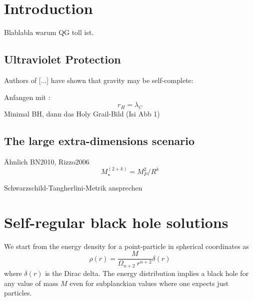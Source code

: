 \documentclass[10pt,a4paper, fleqn]{article}
\begin{document}
\section{Introduction}
Blablabla warum QG toll ist.

\subsection{Ultraviolet Protection}
Authors of [...] have shown that gravity may be self-complete:

Anfangen mit \cite{Isi1}:
\begin{equation}
r_H = \lambda_C
\end{equation}
Minimal BH, dann das Holy Grail-Bild (Isi Abb 1)

\subsection{The large extra-dimensions scenario}
Ähnlich BN2010, Rizzo2006
%
\begin{equation}
M_{\star}^{(2+k)} = M_P^2 / R^k
\end{equation}

Schwarzschild-Tangherlini-Metrik ansprechen

\section{Self-regular black hole solutions}
We start from the energy density for a point-particle in spherical coordinates as
%
\begin{equation}
\label{eq:rho}
\rho(r) = \frac{M}{\Omega_{n+2}~r^{n+2}} \delta(r)
\end{equation}
%
where $\delta(r)$ is the Dirac delta. The energy distribution
implies a black hole for any value of mass $M$ even for subplanckian
values where one expects just particles.
\end{document}
